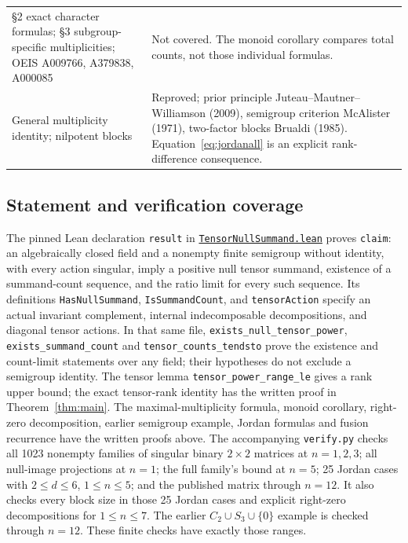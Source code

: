 \documentclass[11pt]{article}
\begin{document}
\begin{center}
\begin{tabularx}{\textwidth}{@{}>{\raggedright\arraybackslash}p{}>{\raggedright\arraybackslash}X@{}}
\S2 exact character formulas; \S3 subgroup-specific multiplicities; OEIS A009766, A379838, A000085 & Not covered. The monoid corollary compares total counts, not those individual formulas. \\
General multiplicity identity; nilpotent blocks & Reproved; prior principle Juteau--Mautner--Williamson (2009), semigroup criterion McAlister (1971), two-factor blocks Brualdi (1985). Equation~\eqref{eq:jordanall} is an explicit rank-difference consequence. \\
\bottomrule
\end{tabularx}
\end{center}

\subsection*{Statement and verification coverage}
The pinned Lean declaration \texttt{result} in
\href{https://github.com/the-omega-institute/trureturing/blob/15070fa5f71c4237050acc7ebe058958cbc04e6e/D5/S3/HomologicalAlgebra/TensorNullSummand.lean}{\texttt{TensorNullSummand.lean}} \cite{Lean} proves
\texttt{claim}: an algebraically closed field and a nonempty finite semigroup
without identity, with every action singular, imply a positive null
tensor summand, existence of a summand-count sequence, and the ratio limit for
every such sequence. Its definitions \texttt{HasNullSummand},
\texttt{IsSummandCount}, and \texttt{tensorAction} specify an actual invariant
complement, internal indecomposable decompositions, and diagonal tensor actions.
In that same file, \texttt{exists\_null\_tensor\_power},
\texttt{exists\_summand\_count} and \texttt{tensor\_counts\_tendsto} prove the
existence and count-limit statements over any field; their hypotheses do not
exclude a semigroup identity. The tensor lemma \texttt{tensor\_power\_range\_le}
gives a rank upper bound; the exact tensor-rank identity has the written proof
in Theorem~\ref{thm:main}. The maximal-multiplicity formula, monoid corollary,
right-zero decomposition, earlier semigroup example, Jordan formulas and fusion recurrence have the written
proofs above. The accompanying \texttt{verify.py}
checks all 1023 nonempty families of singular binary \(2\times2\) matrices at
\(n=1,2,3\); all null-image projections at \(n=1\); the full family's bound at
\(n=5\); 25 Jordan cases with \(2\leq d\leq6\), \(1\leq n\leq5\); and the
published matrix through \(n=12\). It also checks every block size in those
25 Jordan cases and explicit right-zero decompositions for \(1\leq n\leq7\).
The earlier \(C_2\cup S_3\cup\{0\}\) example is checked through \(n=12\).
These finite checks have exactly those ranges.
\end{document}
